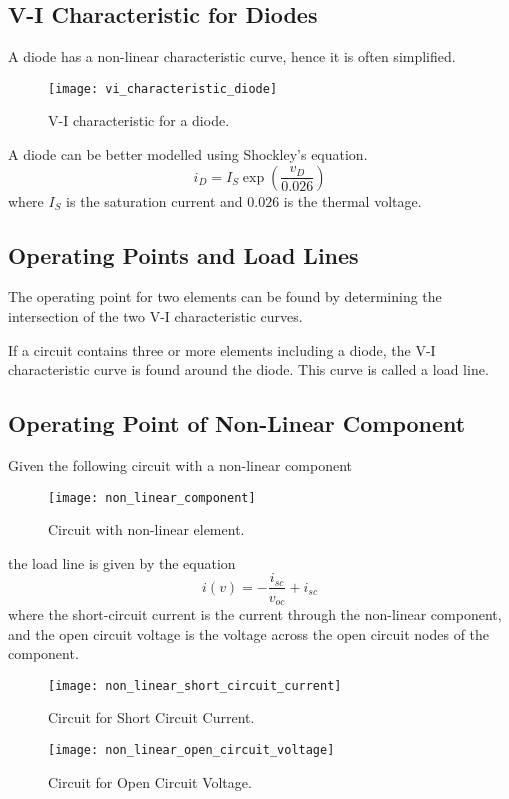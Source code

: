 \documentclass{article}
\begin{document}
\subsection{V-I Characteristic for Diodes}
A diode has a non-linear characteristic curve, hence it is often simplified.
\begin{figure}[H]
    \centering
    \texttt{[image: vi\_characteristic\_diode]}
    \caption{V-I characteristic for a diode.}
\end{figure}
\begin{theorem}
    A diode can be better modelled using Shockley's equation.
    \begin{equation*}
        i_D = I_S \exp{\left( \frac{v_D}{0.026} \right)}
    \end{equation*}
    where $I_S$ is the saturation current and $0.026$ is the thermal voltage.
\end{theorem}
\subsection{Operating Points and Load Lines}
\begin{definition}
    The operating point for two elements can be found by determining the intersection
    of the two V-I characteristic curves.
\end{definition}
\begin{definition}
    If a circuit contains three or more elements including a diode, the V-I characteristic curve
    is found around the diode. This curve is called a load line.
\end{definition}
\subsection{Operating Point of Non-Linear Component}
Given the following circuit with a non-linear component
\begin{figure}[H]
    \centering
    \texttt{[image: non\_linear\_component]}
    \caption{Circuit with non-linear element.}
\end{figure}
the load line is given by the equation
\begin{equation*}
    i(v) = -\frac{i_{sc}}{v_{oc}} + i_{sc}
\end{equation*}
where the short-circuit current is the current through the non-linear component, and the open circuit voltage is the voltage across the
open circuit nodes of the component.
\begin{figure}[H]
    \centering
    \texttt{[image: non\_linear\_short\_circuit\_current]}
    \caption{Circuit for Short Circuit Current.}
\end{figure}
\begin{figure}[H]
    \centering
    \texttt{[image: non\_linear\_open\_circuit\_voltage]}
    \caption{Circuit for Open Circuit Voltage.}
\end{figure}
\newpage
\end{document}
